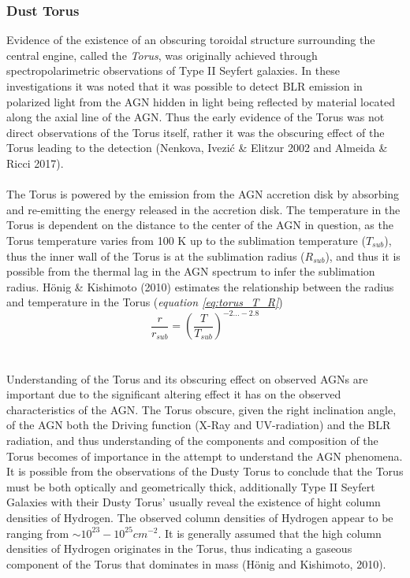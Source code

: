 \documentclass[a4paper, 12pt, twoside]{article}
\begin{document}
\subsubsection{Dust Torus} \label{torus}
Evidence of the existence of an obscuring toroidal structure surrounding the central engine, called the \emph{Torus}, was originally achieved through spectropolarimetric observations of Type II Seyfert galaxies. In these investigations it was noted that it was possible to detect BLR emission in polarized light from the AGN hidden in light being reflected by material located along the axial line of the AGN. Thus the early evidence of the Torus was not direct observations of the Torus itself, rather it was the obscuring effect of the Torus leading to the detection (Nenkova, Ivezić \& Elitzur 2002\cite{Nenkova2002} and Almeida \& Ricci 2017\cite{Almeida2017}).\\
\\
The Torus is powered by the emission from the AGN accretion disk by absorbing and re-emitting the energy released in the accretion disk. The temperature in the Torus is dependent on the distance to the center of the AGN in question, as the Torus temperature varies from 100 K up to the sublimation temperature ($T_{sub}$), thus the inner wall of the Torus is at the sublimation radius ($R_{sub}$), and thus it is possible from the thermal lag in the AGN spectrum to infer the sublimation radius. Hönig \& Kishimoto (2010) estimates the relationship between the radius and temperature in the Torus (\emph{equation \ref{eq:torus_T_R}}) 
\begin{equation}
\frac{r}{r_{sub}} = (\frac{T}{T_{sub}})^{-2...-2.8}
\label{eq:torus_T_R}
\end{equation}\\
\\
Understanding of the Torus and its obscuring effect on observed AGNs are important due to the significant altering effect it has on the observed characteristics of the AGN. The Torus obscure, given the right inclination angle, of the AGN both the Driving function (X-Ray and UV-radiation) and the BLR radiation, and thus understanding of the components and composition of the Torus becomes of importance in the attempt to understand the AGN phenomena. It is possible from the observations of the Dusty Torus to conclude that the Torus must be both optically and geometrically thick, additionally Type II Seyfert Galaxies with their Dusty Torus' usually reveal the existence of hight column densities of Hydrogen. The observed column densities of Hydrogen appear to be ranging from $\sim 10^{23} - 10^{25} cm^{-2}$. It is generally assumed that the high column densities of Hydrogen originates in the Torus, thus indicating a gaseous component of the Torus that dominates in mass (Hönig and Kishimoto, 2010). \\
\end{document}
